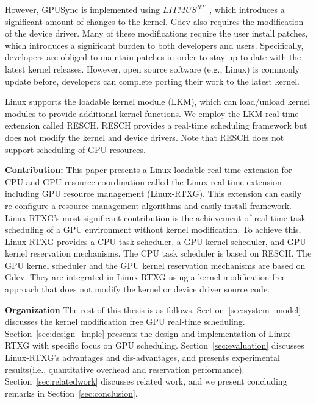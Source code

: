 However, GPUSync is implemented using $LITMUS^{RT}$~\cite{litmus}, which introduces a significant amount of changes to the kernel.
Gdev also requires the modification of the device driver.
Many of these modifications require the user install patches, which introduces a significant burden to both developers and users.
Specifically, developers are obliged to maintain patches in order to stay up to date with the latest kernel releases.
However, open source software (e.g., Linux) is commonly update before, developers can complete porting their work to the latest kernel.

Linux supports the loadable kernel module (LKM), which can load/unload kernel modules to provide additional kernel functions.
We employ the LKM real-time extension called RESCH\cite{kato2009loadable}.
RESCH provides a real-time scheduling framework but does not modify the kernel and device drivers.
Note that RESCH does not support scheduling of GPU resources.

\textbf{Contribution:}
This paper presents a Linux loadable real-time extension for CPU and GPU resource coordination
called the Linux real-time extension including GPU resource management (Linux-RTXG).
This extension can easily re-configure a resource management algorithms and easily install framework.
Linux-RTXG's most significant contribution is the achievement of real-time task scheduling of a GPU environment without kernel modification.
To achieve this, 
Linux-RTXG provides a CPU task scheduler, a GPU kernel scheduler, and GPU kernel reservation mechanisms.
The CPU task scheduler is based on RESCH.
The GPU kernel scheduler and the GPU kernel reservation mechanisms are based on Gdev.
They are integrated in Linux-RTXG using a kernel modification free approach that does not modify the  kernel or device driver source code.

\textbf{Organization}
The rest of this thesis is as follows.
Section~\ref{sec:system_model} discusses the kernel modification free GPU real-time scheduling.
Section~\ref{sec:design_imple} presents the design and implementation of Linux-RTXG with specific focus on GPU scheduling.
Section~\ref{sec:evaluation} discusses Linux-RTXG's  advantages and dis-advantages, and presents experimental results(i.e., quantitative overhead and reservation performance).
Section~\ref{sec:relatedwork} discusses related work, and we present concluding remarks in Section~\ref{sec:conclusion}.
